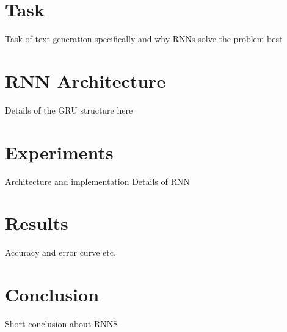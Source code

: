 \documentclass[letterpaper]{article}
\begin{document}
\section{Task}
Task of text generation specifically and why RNNs solve the problem best

\section{RNN Architecture}
Details of the GRU structure here

\section{Experiments}
Architecture and implementation Details of RNN

\section{Results}
Accuracy and error curve etc.

\section{Conclusion}
Short conclusion about RNNS
\end{document}

